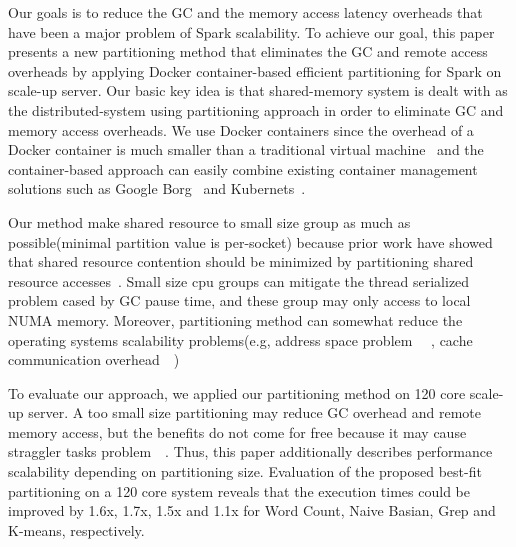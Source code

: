 Our goals is to reduce the GC and the memory access latency overheads that
have been a major problem of Spark scalability.
To achieve our goal, this paper presents a new partitioning method that
eliminates the GC and remote access overheads by applying
Docker container-based efficient partitioning for Spark on scale-up
server.
Our basic key idea is that shared-memory system is dealt with as the
distributed-system using partitioning approach in order to eliminate GC and
memory access overheads.
We use Docker containers since the overhead of a Docker
container is much smaller than a traditional virtual
machine~\cite{Merkel2014DLL} and the container-based approach can easily combine
existing container management solutions such as Google Borg~\cite{Borg} and
Kubernets~\cite{Kubernetes}.

Our method make shared resource to small size group as much as
possible(minimal partition value is per-socket) because prior work have showed
that shared resource contention should be minimized by partitioning shared
resource accesses~\cite{Qureshi2006UCP}.
Small size cpu groups can mitigate the thread serialized problem cased by GC
pause time, and these group may only access to local NUMA memory.
Moreover, partitioning method can somewhat reduce the operating systems
scalability problems(e.g, address space
problem ~\cite{AustinTClements2012RCUBalancedTrees}~\cite{Clements2013RadixVM},
cache communication overhead~\cite{SilasBoydWickizerPth}~\cite{Hendler2010FC})

To evaluate our approach, we applied our partitioning method on 120 core
scale-up server.
A too small size partitioning may reduce GC overhead and remote memory access,
but the benefits do not come for free because it may cause straggler tasks
problem~\cite{Ousterhout2015MSP}~\cite{Ren2015HDS}.
Thus, this paper additionally describes performance scalability
depending on partitioning size.
Evaluation of the proposed best-fit partitioning on a 120 core system
 reveals that the execution times could be improved by 1.6x, 1.7x, 1.5x and 1.1x
 for Word Count, Naive Basian, Grep and K-means, respectively.


